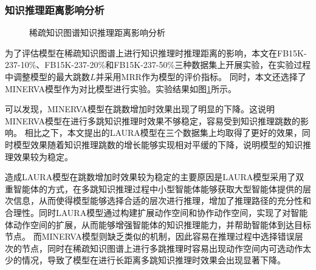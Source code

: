 \documentclass[algorithmlist, AutoFakeBold, AutoFakeSlant, figurelist, tablelist, nomlist, engineering, openany]{seuthesix} %
\begin{document}
\subsubsection{知识推理距离影响分析}
\begin{figure}[t]
  \centering
  \caption{稀疏知识图谱知识推理距离影响分析}
  \label{Experiment2_multihop}
\end{figure}

为了评估模型在稀疏知识图谱上进行知识推理时推理距离的影响，本文在FB15K-237-10\%、FB15K-237-20\%和FB15K-237-50\%三种数据集上开展实验，在实验过程中调整模型的最大跳数$L$并采用MRR作为模型的评价指标。
同时，本文还选择了MINERVA模型作为对比模型进行实验。实验结果如图\ref{Experiment2_multihop}所示。

可以发现，MINERVA模型在跳数增加时效果出现了明显的下降。这说明MINERVA模型在进行多跳知识推理时效果不够稳定，容易受到知识推理跳数的影响。
相比之下，本文提出的LAURA模型在三个数据集上均取得了更好的效果，同时模型效果随着知识推理跳数的增长能够实现相对平缓的下降，说明模型的知识推理效果较为稳定。

造成LAURA模型在跳数增加时效果较为稳定的主要原因是LAURA模型采用了双重智能体的方式，在多跳知识推理过程中小型智能体能够获取大型智能体提供的层次信息，从而使得模型能够选择合适的层次进行推理，增加了推理路径的充分性和合理性。同时LAURA模型通过构建扩展动作空间和协作动作空间，实现了对智能体动作空间的扩展，从而能够增强智能体的知识推理能力，并帮助智能体到达目标节点。
而MINERVA模型则缺乏类似的机制，因此容易在推理过程中选择错误层次的节点，同时在稀疏知识图谱上进行多跳推理时容易出现动作空间内可选动作太少的情况，导致了模型在进行长距离多跳知识推理时效果会出现显著下降。
\end{document}
